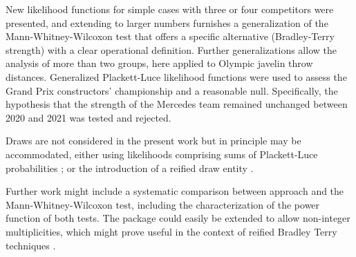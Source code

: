 \documentclass[article]{jss}
\begin{document}
New likelihood functions for simple cases with three or four
competitors were presented, and extending to larger numbers furnishes
a generalization of the Mann-Whitney-Wilcoxon test that offers a
specific alternative (Bradley-Terry strength) with a clear operational
definition.  Further generalizations allow the analysis of more than
two groups, here applied to Olympic javelin throw distances.
Generalized Plackett-Luce likelihood functions were used to assess the
Grand Prix constructors' championship and a reasonable null.
Specifically, the hypothesis that the strength of the Mercedes team
remained unchanged between 2020 and 2021 was tested and rejected.

Draws are not considered in the present work but in principle may be
accommodated, either using likelihoods comprising sums of
Plackett-Luce probabilities \citep{hankin2017}; or the introduction of
a reified draw entity \citep{hankin2010}.

Further work might include a systematic comparison between
 approach and the Mann-Whitney-Wilcoxon test, including
the characterization of the power function of both tests.  The package
could easily be extended to allow non-integer multiplicities, which
might prove useful in the context of reified Bradley Terry
techniques \citep{hankin2020}.


\end{document}
